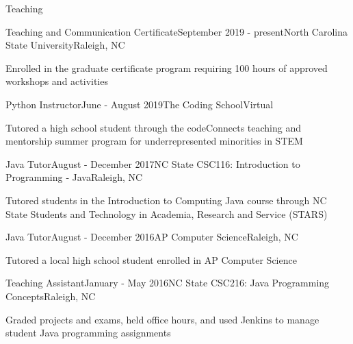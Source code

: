\documentclass{resume} %
\begin{document}

\begin{rSection}{Teaching}

\begin{rSubsection}{Teaching and Communication Certificate}{September 2019 - present}{North Carolina State University}{Raleigh, NC}
\item Enrolled in the graduate certificate program requiring 100 hours of approved workshops and activities
\end{rSubsection}
\vspace{-5pt}
\begin{rSubsection}{Python Instructor}{June - August 2019}{The Coding School}{Virtual}
\item Tutored a high school student through the codeConnects teaching and mentorship summer program for underrepresented minorities in STEM
\end{rSubsection}
\vspace{-5pt}

\begin{rSubsection}{Java Tutor}{August - December 2017}{NC State CSC116: Introduction to Programming ‐ Java}{Raleigh, NC}
\item Tutored students in the Introduction to Computing Java course through NC State Students and Technology in Academia, Research and Service (STARS)
\end{rSubsection}
\vspace{-5pt}
\begin{rSubsection}{Java Tutor}{August - December 2016}{AP Computer Science}{Raleigh, NC}
\item Tutored a local high school student enrolled in AP Computer Science 
\end{rSubsection}
\vspace{-5pt}

\begin{rSubsection}{Teaching Assistant}{January - May 2016}{NC State CSC216: Java Programming Concepts}{Raleigh, NC}
\item Graded projects and exams, held office hours, and used Jenkins to manage student Java programming assignments
\end{rSubsection}
\vspace{-5pt}


\end{rSection}
\end{document}
